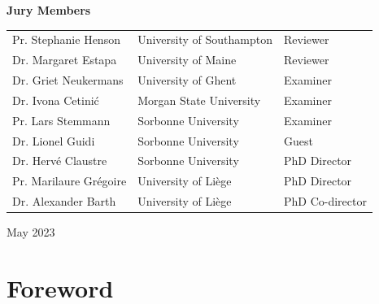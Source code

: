 \documentclass[a4paper]{report}
\begin{document}
\begin{titlepage}
\begin{center}
        \begin{flushleft}
            \large
            \textbf{Jury Members}\\
            \vspace{0.1cm}
            \begin{tabular}{lll}
                Pr. Stephanie Henson & University of Southampton & Reviewer\\
                Dr. Margaret Estapa & University of Maine & Reviewer \\
                Dr. Griet Neukermans & University of Ghent & Examiner \\
                Dr. Ivona Cetini\'{c} & Morgan State University & Examiner\\
                Pr. Lars Stemmann & Sorbonne University & Examiner\\
                Dr. Lionel Guidi & Sorbonne University & Guest\\
                Dr. Hervé Claustre & Sorbonne University & PhD Director\\
                Pr. Marilaure Grégoire & University of Liège & PhD Director\\
                Dr. Alexander Barth & University of Liège & PhD Co-director\\
            \end{tabular}
        \end{flushleft}
        
        \vspace{1cm}
        {\large May 2023} %
   
    \end{center}
\end{titlepage}

\newpage
\thispagestyle{empty}
\null

\newpage
\thispagestyle{empty}
\null

\section*{Foreword}
\end{document}
